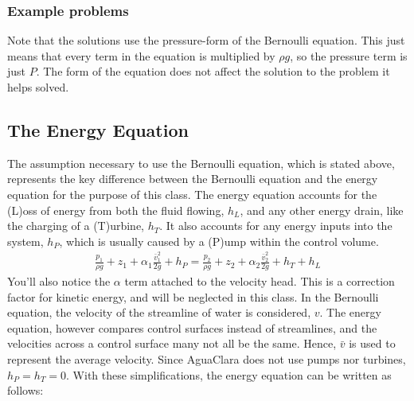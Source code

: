 \documentclass[letterpaper,10pt,english]{sphinxmanual}
\begin{document}
\subsubsection{Example problems}
\label{\detokenize{Fluids_Review/Fluids_Review_Design:example-problems}}
 Note that the solutions use the pressure-form of the Bernoulli equation. This just means that every term in the equation is multiplied by \(\rho g\), so the pressure term is just \(P\). The form of the equation does not affect the solution to the problem it helps solved.


\subsection{The Energy Equation}
\label{\detokenize{Fluids_Review/Fluids_Review_Design:the-energy-equation}}\label{\detokenize{Fluids_Review/Fluids_Review_Design:energy-equation}}
The assumption necessary to use the Bernoulli equation, which is stated above, represents the key difference between the Bernoulli equation and the energy equation for the purpose of this class. The energy equation accounts for the (L)oss of energy from both the fluid flowing, \(h_L\), and any other energy drain, like the charging of a (T)urbine, \(h_T\). It also accounts for any energy inputs into the system, \(h_P\), which is usually caused by a (P)ump within the control volume.
\begin{equation}\label{equation:Fluids_Review/Fluids_Review_Design:Fluids_Review/Fluids_Review_Design:7}
\begin{split}\frac{p_{1}}{\rho g} + z_{1} + \alpha_{1} \frac{\bar v_{1}^2}{2g} + h_P = \frac{p_{2}}{\rho g} + z_{2} + {\alpha_{2}} \frac{\bar v_{2}^2}{2g} + h_T + h_L\end{split}
\end{equation}
You’ll also notice the \(\alpha\) term attached to the velocity head. This is a correction factor for kinetic energy, and will be neglected in this class. In the Bernoulli equation, the velocity of the streamline of water is considered, \(v\). The energy equation, however compares control surfaces instead of streamlines, and the velocities across a control surface many not all be the same. Hence, \(\bar v\) is used to represent the average velocity. Since AguaClara does not use pumps nor turbines, \(h_P = h_T = 0\). With these simplifications, the energy equation can be written as follows:
\end{document}
